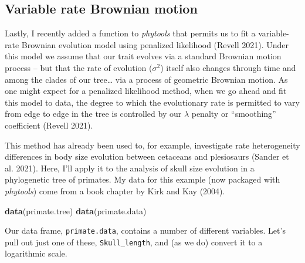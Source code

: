 \documentclass[fleqn,10pt,lineno]{wlpeerj} %
\newenvironment{Shaded}{\begin{snugshade}}{\end{snugshade}}
\newcommand{\FunctionTok}[1]{\textcolor[rgb]{0.13,0.29,0.53}{\textbf{#1}}}
\newcommand{\NormalTok}[1]{#1}
\newcommand{\OtherTok}[1]{\textcolor[rgb]{0.56,0.35,0.01}{#1}}
\newcommand{\SpecialCharTok}[1]{\textcolor[rgb]{0.81,0.36,0.00}{\textbf{#1}}}
\begin{document}
\hypertarget{variable-rate-brownian-motion}{%
\subsection{Variable rate Brownian motion}\label{variable-rate-brownian-motion}}

Lastly, I recently added a function to \emph{phytools} that permits us to fit a variable-rate Brownian evolution model using penalized likelihood (Revell 2021). Under this model we assume that our trait evolves via a standard Brownian motion process -- but that the rate of evolution (\(\sigma^{2}\)) itself also changes through time and among the clades of our tree\ldots{} via a process of geometric Brownian motion. As one might expect for a penalized likelihood method, when we go ahead and fit this model to data, the degree to which the evolutionary rate is permitted to vary from edge to edge in the tree is controlled by our \(\lambda\) penalty or ``smoothing'' coefficient (Revell 2021).

This method has already been used to, for example, investigate rate heterogeneity differences in body size evolution between cetaceans and plesiosaurs (Sander et al. 2021). Here, I'll apply it to the analysis of skull size evolution in a phylogenetic tree of primates. My data for this example (now packaged with \emph{phytools}) come from a book chapter by Kirk and Kay (2004).

\begin{Shaded}
\begin{Highlighting}[]
\FunctionTok{data}\NormalTok{(primate.tree)}
\FunctionTok{data}\NormalTok{(primate.data)}
\end{Highlighting}
\end{Shaded}

Our data frame, \texttt{primate.data}, contains a number of different variables. Let's pull out just one of these, \texttt{Skull\_length}, and (as we do) convert it to a logarithmic scale.

\begin{Shaded}
\end{Shaded}
\end{document}
